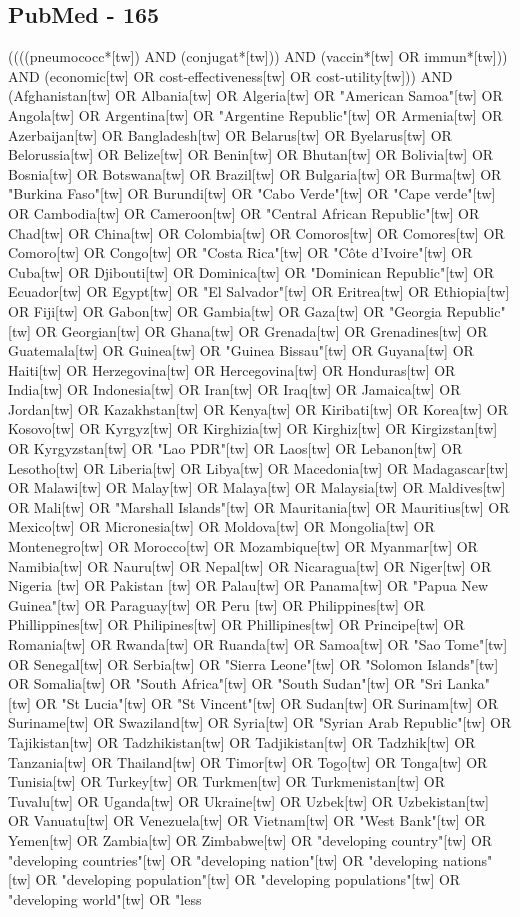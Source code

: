 \documentclass[12pt]{article}
\begin{document}
\subsection{PubMed - 165}
((((pneumococc*[tw]) AND (conjugat*[tw])) AND (vaccin*[tw] OR immun*[tw])) AND (economic[tw] OR cost-effectiveness[tw] OR cost-utility[tw])) AND (Afghanistan[tw] OR Albania[tw] OR Algeria[tw] OR "American Samoa"[tw] OR Angola[tw] OR Argentina[tw] OR "Argentine Republic"[tw] OR Armenia[tw] OR Azerbaijan[tw] OR Bangladesh[tw] OR Belarus[tw] OR Byelarus[tw] OR Belorussia[tw] OR Belize[tw] OR Benin[tw] OR Bhutan[tw] OR Bolivia[tw] OR Bosnia[tw] OR Botswana[tw] OR Brazil[tw] OR Bulgaria[tw] OR Burma[tw] OR "Burkina Faso"[tw] OR Burundi[tw] OR "Cabo Verde"[tw] OR "Cape verde"[tw] OR Cambodia[tw] OR Cameroon[tw] OR "Central African Republic"[tw] OR Chad[tw] OR China[tw] OR Colombia[tw] OR Comoros[tw] OR Comores[tw] OR Comoro[tw] OR Congo[tw] OR "Costa Rica"[tw] OR "Côte d'Ivoire"[tw] OR Cuba[tw] OR Djibouti[tw] OR Dominica[tw] OR "Dominican Republic"[tw] OR Ecuador[tw] OR Egypt[tw] OR "El Salvador"[tw] OR Eritrea[tw] OR Ethiopia[tw] OR Fiji[tw] OR Gabon[tw] OR Gambia[tw] OR Gaza[tw] OR "Georgia Republic"[tw] OR Georgian[tw] OR Ghana[tw] OR Grenada[tw] OR Grenadines[tw] OR Guatemala[tw] OR Guinea[tw] OR "Guinea Bissau"[tw] OR Guyana[tw] OR Haiti[tw] OR Herzegovina[tw] OR Hercegovina[tw] OR Honduras[tw] OR India[tw] OR Indonesia[tw] OR Iran[tw] OR Iraq[tw] OR Jamaica[tw] OR Jordan[tw] OR Kazakhstan[tw] OR Kenya[tw] OR Kiribati[tw] OR Korea[tw] OR Kosovo[tw] OR Kyrgyz[tw] OR Kirghizia[tw] OR Kirghiz[tw] OR Kirgizstan[tw] OR Kyrgyzstan[tw] OR "Lao PDR"[tw] OR Laos[tw] OR Lebanon[tw] OR Lesotho[tw] OR Liberia[tw] OR Libya[tw] OR Macedonia[tw] OR Madagascar[tw] OR Malawi[tw] OR Malay[tw] OR Malaya[tw] OR Malaysia[tw] OR Maldives[tw] OR Mali[tw] OR "Marshall Islands"[tw] OR Mauritania[tw] OR Mauritius[tw] OR Mexico[tw] OR Micronesia[tw] OR Moldova[tw] OR Mongolia[tw] OR Montenegro[tw] OR Morocco[tw] OR Mozambique[tw] OR Myanmar[tw] OR Namibia[tw] OR Nauru[tw] OR Nepal[tw] OR Nicaragua[tw] OR Niger[tw] OR Nigeria [tw] OR Pakistan [tw] OR Palau[tw] OR Panama[tw] OR "Papua New Guinea"[tw] OR Paraguay[tw] OR Peru [tw] OR Philippines[tw] OR Phillippines[tw] OR Philipines[tw] OR Phillipines[tw] OR Principe[tw] OR Romania[tw] OR Rwanda[tw] OR Ruanda[tw] OR Samoa[tw] OR "Sao Tome"[tw] OR Senegal[tw] OR Serbia[tw] OR "Sierra Leone"[tw] OR "Solomon Islands"[tw] OR Somalia[tw] OR "South Africa"[tw] OR "South Sudan"[tw] OR "Sri Lanka"[tw] OR "St Lucia"[tw] OR "St Vincent"[tw] OR Sudan[tw] OR Surinam[tw] OR Suriname[tw] OR Swaziland[tw] OR Syria[tw] OR "Syrian Arab Republic"[tw] OR Tajikistan[tw] OR Tadzhikistan[tw] OR Tadjikistan[tw] OR Tadzhik[tw] OR Tanzania[tw] OR Thailand[tw] OR Timor[tw] OR Togo[tw] OR Tonga[tw] OR Tunisia[tw] OR Turkey[tw] OR Turkmen[tw] OR Turkmenistan[tw] OR Tuvalu[tw] OR Uganda[tw] OR Ukraine[tw] OR Uzbek[tw] OR Uzbekistan[tw] OR Vanuatu[tw] OR Venezuela[tw] OR Vietnam[tw] OR "West Bank"[tw] OR Yemen[tw] OR Zambia[tw] OR Zimbabwe[tw] OR "developing country"[tw] OR "developing countries"[tw] OR "developing nation"[tw] OR "developing nations"[tw] OR "developing population"[tw] OR "developing populations"[tw] OR "developing world"[tw] OR "less 
\end{document}
